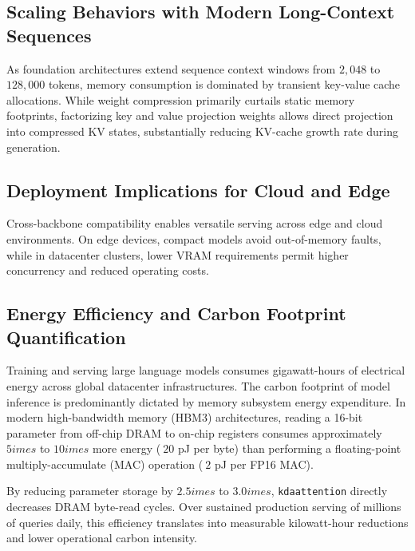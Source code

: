 \subsection{Scaling Behaviors with Modern Long-Context Sequences}
As foundation architectures extend sequence context windows from $2{,}048$ to $128{,}000$ tokens, memory consumption is dominated by transient key-value cache allocations. While weight compression primarily curtails static memory footprints, factorizing key and value projection weights allows direct projection into compressed KV states, substantially reducing KV-cache growth rate during generation.

\subsection{Deployment Implications for Cloud and Edge}
Cross-backbone compatibility enables versatile serving across edge and cloud environments. On edge devices, compact models avoid out-of-memory faults, while in datacenter clusters, lower VRAM requirements permit higher concurrency and reduced operating costs.

\subsection{Energy Efficiency and Carbon Footprint Quantification}
Training and serving large language models consumes gigawatt-hours of electrical energy across global datacenter infrastructures. The carbon footprint of model inference is predominantly dictated by memory subsystem energy expenditure. In modern high-bandwidth memory (HBM3) architectures, reading a 16-bit parameter from off-chip DRAM to on-chip registers consumes approximately $5	imes$ to $10	imes$ more energy ($~20$ pJ per byte) than performing a floating-point multiply-accumulate (MAC) operation ($~2$ pJ per FP16 MAC).

By reducing parameter storage by $2.5	imes$ to $3.0	imes$, \texttt{kdaattention} directly decreases DRAM byte-read cycles. Over sustained production serving of millions of queries daily, this efficiency translates into measurable kilowatt-hour reductions and lower operational carbon intensity.
